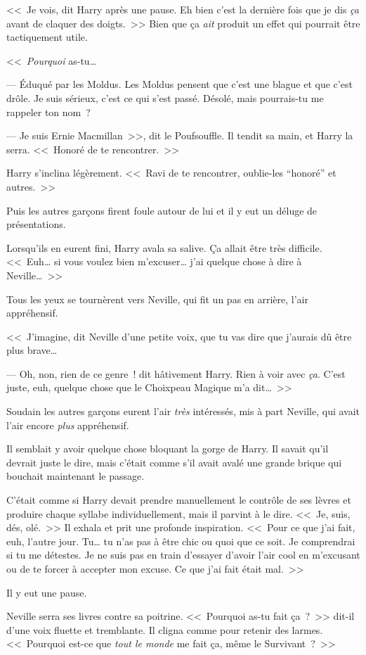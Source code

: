 <<~Je vois, dit Harry après une pause. Eh bien c'est la dernière fois que je dis \emph{ça} avant de claquer des doigts.~>> Bien que ça \emph{ait} produit un effet qui pourrait être tactiquement utile.

<<~\emph{Pourquoi} as-tu…

--- Éduqué par les Moldus. Les Moldus pensent que c'est une blague et que c'est drôle. Je suis sérieux, c'est ce qui s'est passé. Désolé, mais pourrais-tu me rappeler ton nom~?

--- Je suis Ernie Macmillan~>>, dit le Poufsouffle. Il tendit sa main, et Harry la serra. <<~Honoré de te rencontrer.~>>

Harry s'inclina légèrement. <<~Ravi de te rencontrer, oublie-les “honoré” et autres.~>>

Puis les autres garçons firent foule autour de lui et il y eut un déluge de présentations.

Lorsqu'ils en eurent fini, Harry avala sa salive. Ça allait être très difficile. <<~Euh… si vous voulez bien m'excuser… j'ai quelque chose à dire à Neville…~>>

Tous les yeux se tournèrent vers Neville, qui fit un pas en arrière, l'air appréhensif.

<<~J'imagine, dit Neville d'une petite voix, que tu vas dire que j'aurais dû être plus brave…

--- Oh, non, rien de ce genre~! dit hâtivement Harry. Rien à voir avec \emph{ça}. C'est juste, euh, quelque chose que le Choixpeau Magique m'a dit…~>>

Soudain les autres garçons eurent l'air \emph{très} intéressés, mis à part Neville, qui avait l'air encore \emph{plus} appréhensif.

Il semblait y avoir quelque chose bloquant la gorge de Harry. Il savait qu'il devrait juste le dire, mais c'était comme s'il avait avalé une grande brique qui bouchait maintenant le passage.

C'était comme si Harry devait prendre manuellement le contrôle de ses lèvres et produire chaque syllabe individuellement, mais il parvint à le dire. <<~Je, suis, dés, olé.~>> Il exhala et prit une profonde inspiration. <<~Pour ce que j'ai fait, euh, l'autre jour. Tu… tu n'as pas à être chic ou quoi que ce soit. Je comprendrai si tu me détestes. Je ne suis pas en train d'essayer d'avoir l'air cool en m'excusant ou de te forcer à accepter mon excuse. Ce que j'ai fait était mal.~>>

Il y eut une pause.

Neville serra ses livres contre sa poitrine. <<~Pourquoi as-tu fait ça~?~>> dit-il d'une voix fluette et tremblante. Il cligna comme pour retenir des larmes. <<~Pourquoi est-ce que \emph{tout le monde} me fait ça, même le Survivant~?~>>


